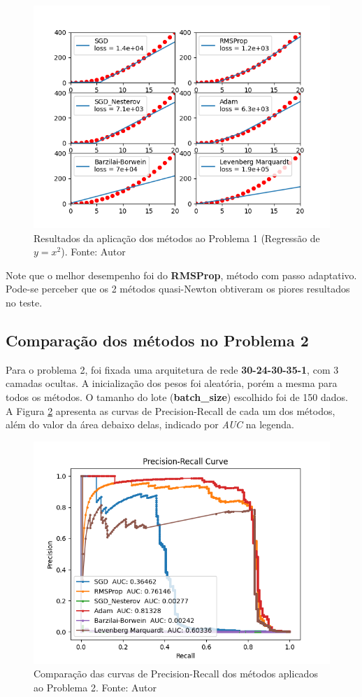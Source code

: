 \documentclass[11pt]{article}
\begin{document}
\begin{figure}[H]
\center
\includegraphics[scale=0.7]{Figuras/REG.png}
\caption{Resultados da aplicação dos métodos ao Problema 1 (Regressão de  $y = x^2$). Fonte: Autor} 
\label{REG}
\end{figure}


\noindent
Note que o melhor desempenho foi do \textbf{RMSProp}, método com passo adaptativo. Pode-se perceber que os 2 métodos quasi-Newton obtiveram os piores resultados no teste.


\subsection*{Comparação dos métodos no Problema 2}
Para o problema 2, foi fixada uma arquitetura de rede \textbf{30-24-30-35-1}, com 3 camadas ocultas. A inicialização dos pesos foi aleatória, porém a mesma para todos os métodos. O tamanho do lote (\textbf{batch\_size}) escolhido foi de 150 dados.
A Figura \ref{FRAUD} apresenta as curvas de Precision-Recall de cada um dos métodos, além do valor da área debaixo delas, indicado por \textit{AUC} na legenda.

\begin{figure}[H]
\center
\includegraphics[scale=0.8]{Figuras/FRAUD.png}
\caption{Comparação das curvas de Precision-Recall dos métodos aplicados ao Problema 2. Fonte: Autor} 
\label{FRAUD}
\end{figure}
\end{document}

